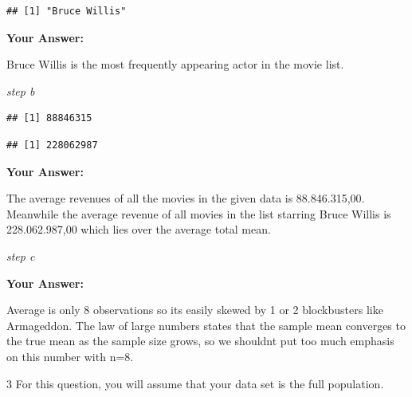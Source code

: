 \documentclass[
]{article}
\newenvironment{Shaded}{\begin{snugshade}}{\end{snugshade}}
\newcommand{\FunctionTok}[1]{\textcolor[rgb]{0.13,0.29,0.53}{\textbf{#1}}}
\newcommand{\NormalTok}[1]{#1}
\newcommand{\OtherTok}[1]{\textcolor[rgb]{0.56,0.35,0.01}{#1}}
\newcommand{\SpecialCharTok}[1]{\textcolor[rgb]{0.81,0.36,0.00}{\textbf{#1}}}
\newcommand{\StringTok}[1]{\textcolor[rgb]{0.31,0.60,0.02}{#1}}
\begin{document}
\begin{verbatim}
## [1] "Bruce Willis"
\end{verbatim}

\textbf{Your Answer:}

Bruce Willis is the most frequently appearing actor in the movie list.

\emph{step b}

\begin{Shaded}
\end{Shaded}

\begin{verbatim}
## [1] 88846315
\end{verbatim}

\begin{Shaded}
\end{Shaded}

\begin{verbatim}
## [1] 228062987
\end{verbatim}

\textbf{Your Answer:}

The average revenues of all the movies in the given data is
88.846.315,00. Meanwhile the average revenue of all movies in the list
starring Bruce Willis is 228.062.987,00 which lies over the average
total mean.

\emph{step c}

\textbf{Your Answer:}

Average is only 8 observations so its easily skewed by 1 or 2
blockbusters like Armageddon. The law of large numbers states that the
sample mean converges to the true mean as the sample size grows, so we
shouldnt put too much emphasis on this number with n=8.

3 For this question, you will assume that your data set is the full
population.
\end{document}
